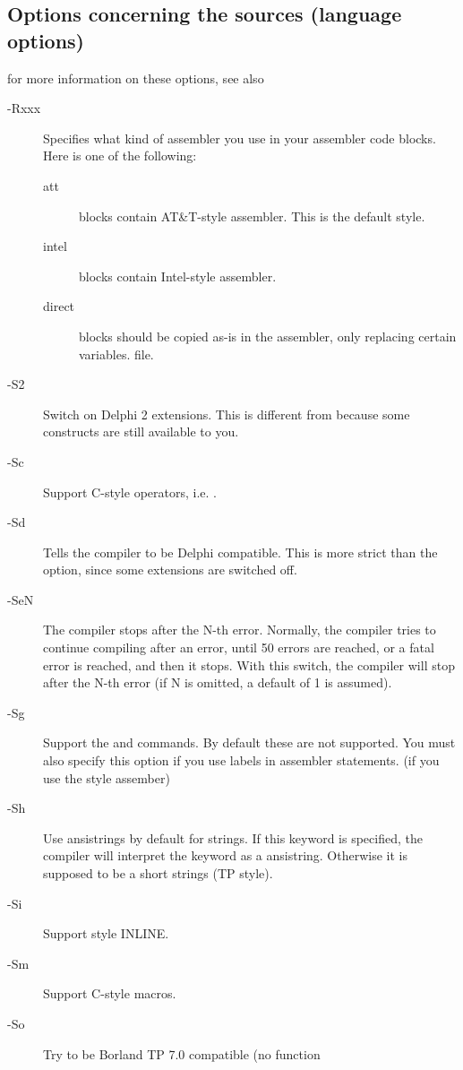 \documentclass{report}
\begin{document}
\subsection{Options concerning the sources (language options)}
for more information on these options, see also \progref
\begin{description}
\item [-Rxxx]  Specifies what kind of assembler you use in
your  assembler code blocks. Here  is one of the following:
\begin{description}
\item [att\ ]  blocks contain AT\&T-style  assembler.
This is the default style.
\item [intel]  blocks contain Intel-style assembler.
\item [direct]  blocks should be copied as-is in the assembler,
only replacing certain variables.
file.
\end{description}
\item [-S2]  Switch on Delphi 2 extensions.  This is different
from  because some \fpc constructs are still available to you.
\item [-Sc]  Support C-style operators, i.e. .
\item [-Sd] Tells the compiler to be Delphi compatible. This is more strict
than the  option, since some  extensions are switched off.
\item [-SeN]  The compiler stops after the N-th error. Normally,
the compiler tries to continue compiling after an error, until 50 errors are
reached, or a fatal error is reached, and then it stops. With this switch,
the compiler will stop after the N-th error (if N is omitted, a default of 1
is assumed).
\item [-Sg]  Support the  and  commands. By
default these are not supported. You must also specify this option if you
use labels in assembler statements. (if you use the  style
assember)
\item [-Sh] Use ansistrings by default for strings. If this keyword is
specified, the compiler will interpret the  keyword as a
ansistring. Otherwise it is supposed to be a short strings (TP style).
\item [-Si]  Support  style INLINE.
\item [-Sm]  Support C-style macros.
\item [-So]  Try to be Borland TP 7.0 compatible (no function

\end{description}
\end{document}
